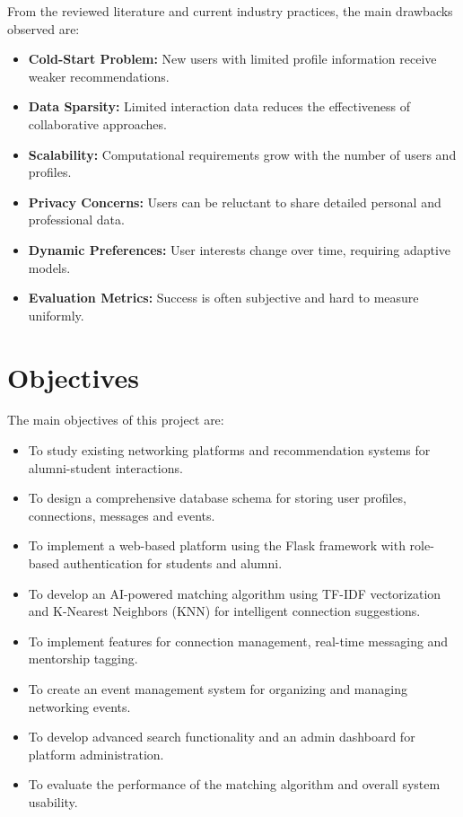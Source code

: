 \documentclass[12pt,a4paper]{report}
\let\origsection\section
\renewcommand{\section}{\needspace{4\baselineskip}\origsection}
\begin{document}
From the reviewed literature and current industry practices, the main drawbacks observed are:

\begin{itemize}[noitemsep]
    \item \textbf{Cold-Start Problem:} New users with limited profile information receive weaker recommendations.
    \item \textbf{Data Sparsity:} Limited interaction data reduces the effectiveness of collaborative approaches.
    \item \textbf{Scalability:} Computational requirements grow with the number of users and profiles.
    \item \textbf{Privacy Concerns:} Users can be reluctant to share detailed personal and professional data.
    \item \textbf{Dynamic Preferences:} User interests change over time, requiring adaptive models.
    \item \textbf{Evaluation Metrics:} Success is often subjective and hard to measure uniformly.
\end{itemize}

\section{Objectives}

The main objectives of this project are:

\begin{itemize}[noitemsep]
    \item To study existing networking platforms and recommendation systems for alumni-student interactions.
    \item To design a comprehensive database schema for storing user profiles, connections, messages and events.
    \item To implement a web-based platform using the Flask framework with role-based authentication for students and alumni.
    \item To develop an AI-powered matching algorithm using TF-IDF vectorization and K-Nearest Neighbors (KNN) for intelligent connection suggestions.
    \item To implement features for connection management, real-time messaging and mentorship tagging.
    \item To create an event management system for organizing and managing networking events.
    \item To develop advanced search functionality and an admin dashboard for platform administration.
    \item To evaluate the performance of the matching algorithm and overall system usability.
\end{itemize}
\end{document}
